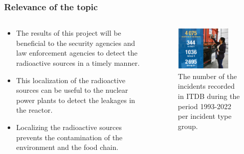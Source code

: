 \documentclass[aspectratio=169]{beamer}
\begin{document}
\begin{frame}
  \frametitle{Relevance of the topic}
  
  \begin{columns}
    \begin{column}{0.5\textwidth}
      \begin{itemize}
        \item The results of this project will be beneficial to the security agencies and law enforcement agencies to detect the radioactive sources in a timely manner.
        \item This localization of the radioactive sources can be useful to the nuclear power plants to detect the leakages in the reactor.
        \item Localizing the radioactive sources prevents the contamination of the environment and the food chain.
      \end{itemize}
  
    \end{column}
    \begin{column}{0.5\textwidth}
      \begin{figure}
        \centering
        \includegraphics[width=0.8\textwidth]{images/radi_incidents2.png}
        \caption{The number of the incidents recorded in ITDB during the period 1993-2022 per incident type group. \cite{iaea2022itdb}}
        \label{fig:Relevance}
      \end{figure}
    \end{column}
  \end{columns}
    
  \end{frame}


\end{document}

